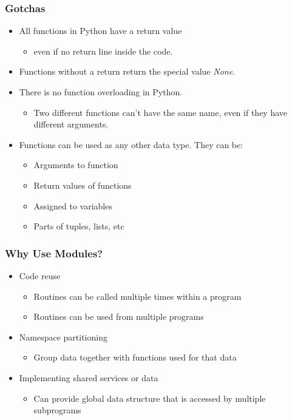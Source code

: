 \documentclass[12pt,handout]{beamer}
\begin{document}
\begin{frame}[fragile]
\frametitle{Gotchas}
\begin{itemize}
\item All functions in Python have a return value
\begin{itemize}
\item even if no return line inside the code.
\end{itemize}
\item Functions without a return return the special value 
{\it None}.
\item There is no function overloading in Python.
\begin{itemize}
\item Two different functions can't have the same name, even if they 
have different arguments.
\end{itemize}
\item Functions can be used as any other data type. 
They can be:
\begin{itemize}
\item Arguments to function
\item Return values of functions
\item Assigned to variables
\item Parts of tuples, lists, etc
\end{itemize}
\end{itemize}
\end{frame}

\begin{frame}[fragile]
\frametitle{Why Use Modules?}
\begin{itemize}
\item Code reuse
\begin{itemize}
\item Routines can be called multiple times within a program
\item Routines can be used from multiple programs
\end{itemize}
\item Namespace partitioning
\begin{itemize}
\item Group data together with functions used for that data
\end{itemize}
\item Implementing shared services or data
\begin{itemize}
\item Can provide global data structure that is accessed by multiple
  subprograms
\end{itemize}
\end{itemize}
\end{frame}
\end{document}
